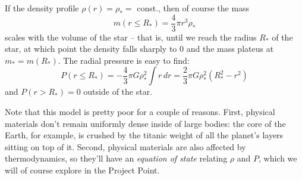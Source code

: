 \documentclass[11pt]{article}
\begin{document}
\begin{enumerate}
\hspace{15pt} If the density profile $\rho(r) = \rho_* =$ const., then of course the mass
\[ m(r \leq R_*) = \frac{4}{3}\pi r^3 \rho_* \]
scales with the volume of the star -- that is, until we reach the radius $R_*$ of the star, at which point the density falls sharply to 0 and the mass plateus at $m_* = m(R_*)$. The radial pressure is easy to find:
\[ P(r\leq R_*) = -\frac{4}{3}\pi G\rho^2_* \int r\,dr = \frac{2}{3}\pi G\rho^2_*(R^2_* - r^2) \]
and $P(r>R_*) = 0$ outside of the star.

\hspace{15pt} Note that this model is pretty poor for a couple of reasons. First, physical materials don't remain uniformly dense inside of large bodies: the core of the Earth, for example, is crushed by the titanic weight of all the planet's layers sitting on top of it. Second, physical materials are also affected by thermodynamics, so they'll have an \textit{equation of state} relating $\rho$ and $P$, which we will of course explore in the Project Point.

\end{enumerate}
\end{document}
